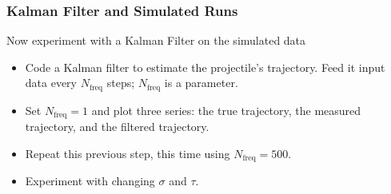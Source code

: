 \documentclass{beamer}
\begin{document}
\begin{frame}
\frametitle{Kalman Filter and Simulated Runs}
Now experiment with a Kalman Filter on the simulated data
\begin{itemize}
\item Code a Kalman filter to estimate the projectile's trajectory.  
Feed it input data every $N_\text{freq}$ steps; $N_\text{freq}$ is a parameter.
\item Set $N_{\text{freq}}=1$ and plot three series: the true trajectory, the measured trajectory, and the filtered trajectory.
\item Repeat this previous step, this time using $N_{\text{freq}}=500$.
\item Experiment with changing $\sigma$ and $\tau$.
\end{itemize}
\end{frame}
\end{document}
